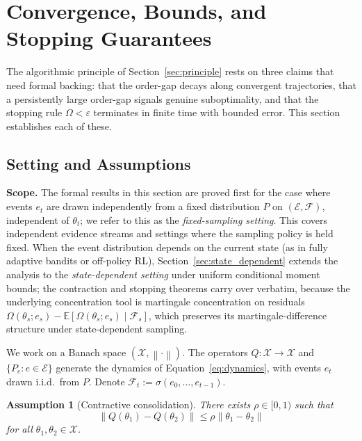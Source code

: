 \documentclass[12pt,a4paper]{article}
\newtheorem{assumption}[definition]{Assumption}
\newcommand{\X}{\mathcal{X}}
\newcommand{\E}{\mathcal{E}}
\newcommand{\norm}[1]{\left\lVert#1\right\rVert}
\newcommand{\Ogap}{\Omega}
\begin{document}
\section{Convergence, Bounds, and Stopping Guarantees}
\label{sec:theory}

The algorithmic principle of Section~\ref{sec:principle} rests on three
claims that need formal backing: that the order-gap decays along convergent
trajectories, that a persistently large order-gap signals genuine
suboptimality, and that the stopping rule $\Ogap < \varepsilon$ terminates
in finite time with bounded error. This section establishes each of these.

\subsection{Setting and Assumptions}
\label{sec:theory_setup}

\textbf{Scope.}
The formal results in this section are proved first for the case where
events $e_t$ are drawn independently from a fixed distribution $P$ on
$(\E, \mathcal{F})$, independent of $\theta_t$; we refer to this as the
\emph{fixed-sampling setting}. This covers independent evidence streams and
settings where the sampling policy is held fixed. When the event distribution
depends on the current state (as in fully adaptive bandits or off-policy
RL), Section~\ref{sec:state_dependent} extends the analysis to the
\emph{state-dependent setting} under uniform conditional moment bounds; the
contraction and stopping theorems carry over verbatim, because the
underlying concentration tool is martingale concentration on residuals
$\Ogap(\theta_s; e_s) - \mathbb{E}[\Ogap(\theta_s; e_s) \mid \mathcal{F}_s]$,
which preserves its martingale-difference structure under state-dependent
sampling.

We work on a Banach space $(\X, \norm{\cdot})$. The operators $Q: \X \to \X$
and $\{P_e : e \in \E\}$ generate the dynamics of Equation~\eqref{eq:dynamics},
with events $e_t$ drawn i.i.d.\ from $P$. Denote
$\mathcal{F}_t := \sigma(e_0, \ldots, e_{t-1})$.

\begin{assumption}[Contractive consolidation]
\label{ass:contract}
There exists $\rho \in [0, 1)$ such that
\[
\norm{Q(\theta_1) - Q(\theta_2)} \leq \rho \norm{\theta_1 - \theta_2}
\]
for all $\theta_1, \theta_2 \in \X$.
\end{assumption}
\end{document}
